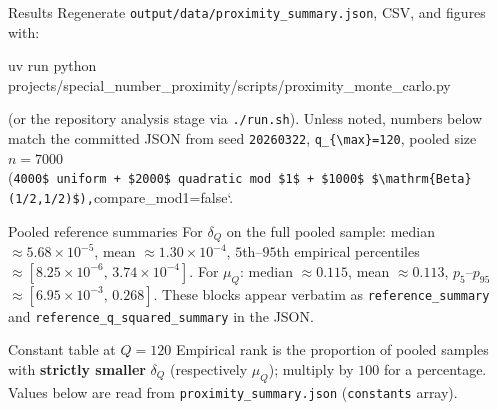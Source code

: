 \documentclass[
  ignorenonframetext,
]{beamer}
\author{\texorpdfstring{}{}}
\date{}
\newenvironment{Shaded}{}{}
\newcommand{\ExtensionTok}[1]{#1}
\newcommand{\NormalTok}[1]{#1}
\begin{document}
\begin{frame}[fragile]{Results}
\protect{}\label{results}
Regenerate \texttt{output/data/proximity\_summary.json}, CSV, and
figures with:

\begin{Shaded}
\begin{Highlighting}[]
\ExtensionTok{uv}\NormalTok{ run python projects/special\_number\_proximity/scripts/proximity\_monte\_carlo.py}
\end{Highlighting}
\end{Shaded}

(or the repository analysis stage via \texttt{./run.sh}). Unless noted,
numbers below match the committed JSON from seed \texttt{20260322},
\texttt{q\_\{\textbackslash{}max\}=120}, pooled size \(n=7000\)
(\texttt{4000\$\ uniform\ +\ \$2000\$\ quadratic\ mod\ \$1\$\ +\ \$1000\$\ \$\textbackslash{}mathrm\{Beta\}(1/2,1/2)\$),}compare\_mod1=false`.

\begin{block}{Pooled reference summaries}
\protect{}\label{pooled-reference-summaries}
For \(\delta_Q\) on the full pooled sample: median
\(\approx 5.68\times 10^{-5}\), mean \(\approx 1.30\times 10^{-4}\),
\(5\)th--\(95\)th empirical percentiles
\(\approx [8.25\times 10^{-6},\,3.74\times 10^{-4}]\). For \(\mu_Q\):
median \(\approx 0.115\), mean \(\approx 0.113\), \(p_5\)--\(p_{95}\)
\(\approx [6.95\times 10^{-3},\,0.268]\). These blocks appear verbatim
as \texttt{reference\_summary} and
\texttt{reference\_q\_squared\_summary} in the JSON.
\end{block}

\begin{block}{Constant table at \(Q=120\)}
\protect{}\label{constant-table-at-q120}
Empirical rank is the proportion of pooled samples with \textbf{strictly
smaller} \(\delta_Q\) (respectively \(\mu_Q\)); multiply by \(100\) for
a percentage. Values below are read from
\texttt{proximity\_summary.json} (\texttt{constants} array).


\end{block}
\end{frame}
\end{document}
